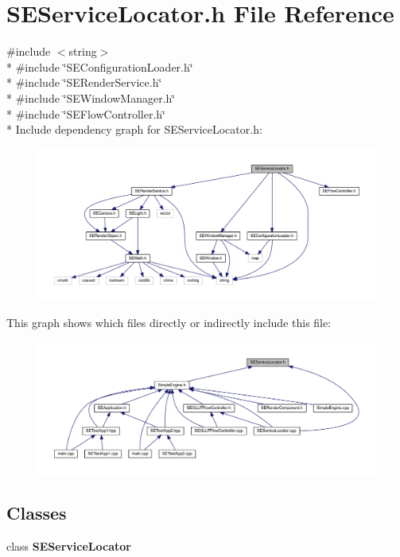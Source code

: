 \section{S\+E\+Service\+Locator.\+h File Reference}
\label{_s_e_service_locator_8h}
{\ttfamily \#include $<$string$>$}\\*
{\ttfamily \#include \char`\"{}S\+E\+Configuration\+Loader.\+h\char`\"{}}\\*
{\ttfamily \#include \char`\"{}S\+E\+Render\+Service.\+h\char`\"{}}\\*
{\ttfamily \#include \char`\"{}S\+E\+Window\+Manager.\+h\char`\"{}}\\*
{\ttfamily \#include \char`\"{}S\+E\+Flow\+Controller.\+h\char`\"{}}\\*
Include dependency graph for S\+E\+Service\+Locator.\+h\+:
\nopagebreak
\begin{figure}[H]
\begin{center}
\leavevmode
\includegraphics[width=350pt]{_s_e_service_locator_8h__incl}
\end{center}
\end{figure}
This graph shows which files directly or indirectly include this file\+:
\nopagebreak
\begin{figure}[H]
\begin{center}
\leavevmode
\includegraphics[width=350pt]{_s_e_service_locator_8h__dep__incl}
\end{center}
\end{figure}
\subsection*{Classes}
\begin{DoxyCompactItemize}
\item 
class {\bf S\+E\+Service\+Locator}
\end{DoxyCompactItemize}
